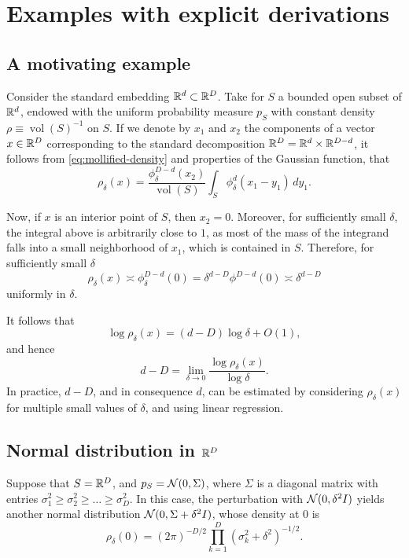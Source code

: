   
\section{Examples with explicit derivations}

\subsection{A motivating example}
\label{sec:motivating-example}

Consider the standard embedding $\mathbb{R}^d \subset \mathbb{R}^D$. Take for $S$ a bounded open subset of $\mathbb{R}^d$, endowed with the uniform probability measure $p_S$ with constant density $\rho\equiv\operatorname{vol}(S)^{-1}$ on $S$. If we denote by $x_1$ and $x_2$ the components of a vector $x\in \mathbb{R}^D$ corresponding to the standard decomposition $\mathbb{R}^D = \mathbb{R}^d \times \mathbb{R}^{D-d}$, it follows from \eqref{eq:mollified-density} and properties of the Gaussian function, that
\begin{equation}
    \label{eq:flat-example-mollified-density}
    \rho_\delta(x) = 
    \frac{\phi^{D-d}_{\delta}(x_2)}{\operatorname{vol}(S)} 
    \int_S \phi^d_{\delta}(x_1-y_1) \, d y_1.
\end{equation}

Now, if $x$ is an interior point of $S$, then $x_2=0$. Moreover, for sufficiently small $\delta$, the integral above is arbitrarily close to $1$, as most of the mass of the integrand falls into a small neighborhood of $x_1$, which is contained in $S$. Therefore, for sufficiently small $\delta$
\begin{equation}
    \rho_\delta(x) \asymp \phi^{D-d}_\delta(0) = \delta^{d-D}\phi^{D-d}(0) \asymp \delta^{d-D}
\end{equation}
uniformly in $\delta$.

It follows that
\begin{equation}
    \log \rho_\delta(x) = (d-D) \log\delta + O(1),
\end{equation}
and hence
\begin{equation}
    d-D = \lim_{\delta\to 0} \frac{\log \rho_\delta(x)}{\log\delta}.
\end{equation}
In practice, $d-D$, and in consequence $d$, can be estimated by considering $\rho_\delta(x)$ for multiple small values of $\delta$, and using linear regression. 



\subsection{Normal distribution in $\mathbb{R}^D$}
\label{sec:delta-gaussian-dimensions}
Suppose that $S=\mathbb{R}^D$, and $p_S = \mathcal{N}(0, \Sigma)$, where $\Sigma$ is a diagonal matrix with entries $\sigma_1^2 \geq \sigma_2^2 \geq\dots\geq \sigma_D^2$. In this case, the perturbation with $\mathcal{N}(0, \delta^2 I)$ yields another normal distribution $\mathcal{N}(0, \Sigma + \delta^2 I)$, whose density at $0$ is
\begin{equation}
\label{eq:perturbed-normal-distribution-at-0}
    \rho_\delta(0) = (2\pi)^{-D/2}\prod_{k=1}^D (\sigma_k^2 + \delta^2)^{-1/2}.
\end{equation}

